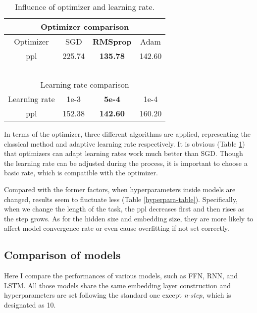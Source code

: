 \documentclass[11pt,a4paper]{article}
\begin{document}
\begin{table}[h]
\centering
\begin{tabular}{cccc} 
\hline
\multicolumn{4}{c}{Optimizer comparison}  \\ 
\hline
Optimizer & SGD    & \textbf{RMSprop} & Adam          \\
ppl       & 225.74 & \textbf{135.78}  & 142.60         \\ 
\hline
~         & ~     & ~       & ~             \\ 
\hline
\multicolumn{4}{c}{Learning rate comparison}         \\ 
\hline
Learning rate  & 1e-3   & \textbf{5e-4}   & 1e-4         \\
ppl            & 152.38 & \textbf{142.60} & 160.20       \\
\hline
\end{tabular}
\caption{\label{base-table} Influence of optimizer and learning rate. }
\end{table}

In terms of the optimizer, three different algorithms are applied, representing the classical method and adaptive learning rate respectively. 
It is obvious (Table \ref{base-table}) that optimizers can adapt learning rates work much better than SGD. Though the learning rate can be adjusted during the process, it is important to choose a basic rate, which is compatible with the optimizer. 

Compared with the former factors, when hyperparameters inside models are changed, results seem to fluctuate less (Table \ref{hyperpara-table}).
Specifically, when we change the length of the task, the ppl decreases first and then rises as the step grows. As for the hidden size and embedding size, they are more likely to affect model convergence rate or even cause overfitting if not set correctly.

\subsection{Comparison of models}
\label{compare}
Here I compare the performances of various models, such as FFN, RNN, and LSTM. All those models share the same embedding layer construction and hyperparameters are set following the standard one except \emph{n-step}, which is designated as 10.
\end{document}
